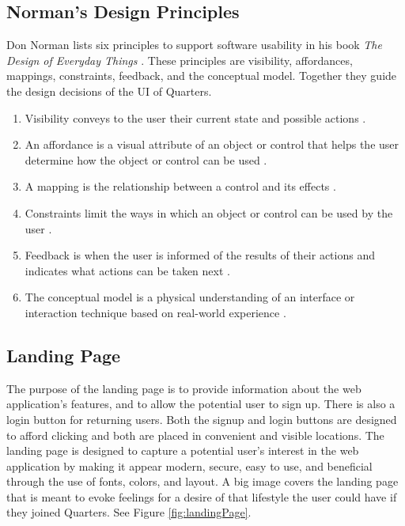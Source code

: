 \documentclass[12pt]{article}
\begin{document}
\subsection{Norman's Design Principles}
Don Norman lists six principles to support software usability in his book \textit{The Design of Everyday Things} \cite{norman}. These principles are visibility, affordances, mappings, constraints, feedback, and the conceptual model. Together they guide the design decisions of the UI of Quarters.

\begin{enumerate}
\item Visibility conveys to the user their current state and possible actions \cite{norman}.
\item An affordance is a visual attribute of an object or control that helps the user determine how the object or control can be used \cite{norman}.
\item A mapping is the relationship between a control and its effects \cite{norman}.
\item Constraints limit the ways in which an object or control can be used by the user \cite{norman}.
\item Feedback is when the user is informed of the results of their actions and indicates what actions can be taken next \cite{norman}.
\item The conceptual model is a physical understanding of an interface or interaction technique based on real-world experience \cite{norman}.
\end{enumerate}

\subsection{Landing Page}
The purpose of the landing page is to provide information about the web application's features, and to allow the potential user to sign up. There is also a login button for returning users. Both the signup and login buttons are designed to afford clicking and both are placed in convenient and visible locations. The landing page is designed to capture a potential user's interest in the web application by making it appear modern, secure, easy to use, and beneficial through the use of fonts, colors, and layout. A big image covers the landing page that is meant to evoke feelings for a desire of that lifestyle the user could have if they joined Quarters. See Figure \ref{fig:landingPage}.
\end{document}
